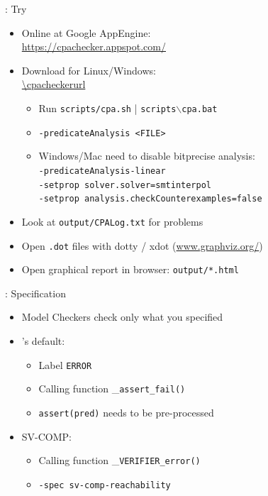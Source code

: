 \begin{frame}{\cpacheckertitle: Try \cpachecker}
  \begin{itemize}
    \item Online at Google AppEngine:\\
    \url{https://cpachecker.appspot.com/}
    \item Download for Linux/Windows:\\
    \url{\cpacheckerurl}
    \begin{itemize}
      \item Run \texttt{scripts/cpa.sh} | \texttt{scripts$\backslash$cpa.bat}
      \item \texttt{-predicateAnalysis <FILE>}
      \item Windows/Mac need to disable bitprecise analysis:\\
        \texttt{-predicateAnalysis-linear\\ -setprop solver.solver=smtinterpol\\ -setprop analysis.checkCounterexamples=false}
    \end{itemize}
    \item Look at \texttt{output/CPALog.txt} for problems
    \item Open \texttt{.dot} files with dotty / xdot (\url{www.graphviz.org/})
    \item Open graphical report in browser: \texttt{output/*.html}
  \end{itemize}
\end{frame}


\begin{frame}{\cpacheckertitle: Specification}
  \begin{itemize}
    \item Model Checkers check only what you specified
    \item \cpachecker's default:
    \begin{itemize}
      \item Label \texttt{ERROR}
      \item Calling function \_\texttt{assert\_fail()}
      \item \texttt{assert(pred)} needs to be pre-processed
    \end{itemize}
    \item SV-COMP:
    \begin{itemize}
      \item Calling function \_\texttt{VERIFIER\_error()}
      \item \texttt{-spec sv-comp-reachability}
    \end{itemize}
  \end{itemize}
\end{frame}

